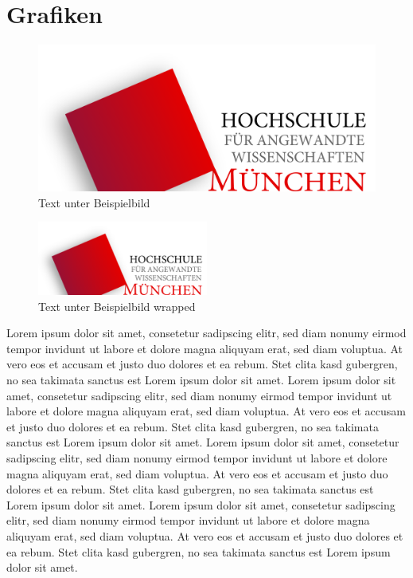 \documentclass[
							a4paper, 
							11pt, 
							openany, 
							liststotoc,
							parskip=half, 
   							headings=normal
						]{scrreprt}
\begin{document}
\section{Grafiken} \label{se:konstrukte_grafiken}
\begin{figure}[H]
\begin{center}
    \includegraphics[width=1.0\textwidth]{./pictures/hm_logo_svg.pdf}
	\caption[Kurzeintrag Verzeichnis Beispielbild]{Text unter Beispielbild} \label{fig:beispielbild}
\end{center}
\end{figure}

\begin{figure}
  \begin{center}
    \includegraphics[width=0.5\textwidth]{./pictures/hm_logo_svg.pdf}
  \end{center}
  \caption[Kurzeintrag Verzeichnis Beispielbild wrapped]{Text unter Beispielbild wrapped} \label{fig:beispielbild_wrapped} 
\end{figure}
Lorem ipsum dolor sit amet, consetetur sadipscing elitr, sed diam nonumy eirmod tempor invidunt ut labore et dolore magna aliquyam erat, sed diam voluptua. At vero eos et accusam et justo duo dolores et ea rebum. Stet clita kasd gubergren, no sea takimata sanctus est Lorem ipsum dolor sit amet. Lorem ipsum dolor sit amet, consetetur sadipscing elitr, sed diam nonumy eirmod tempor invidunt ut labore et dolore magna aliquyam erat, sed diam voluptua. At vero eos et accusam et justo duo dolores et ea rebum. Stet clita kasd gubergren, no sea takimata sanctus est Lorem ipsum dolor sit amet.
Lorem ipsum dolor sit amet, consetetur sadipscing elitr, sed diam nonumy eirmod tempor invidunt ut labore et dolore magna aliquyam erat, sed diam voluptua. At vero eos et accusam et justo duo dolores et ea rebum. Stet clita kasd gubergren, no sea takimata sanctus est Lorem ipsum dolor sit amet. Lorem ipsum dolor sit amet, consetetur sadipscing elitr, sed diam nonumy eirmod tempor invidunt ut labore et dolore magna aliquyam erat, sed diam voluptua. At vero eos et accusam et justo duo dolores et ea rebum. Stet clita kasd gubergren, no sea takimata sanctus est Lorem ipsum dolor sit amet.
\clearpage
\end{document}
